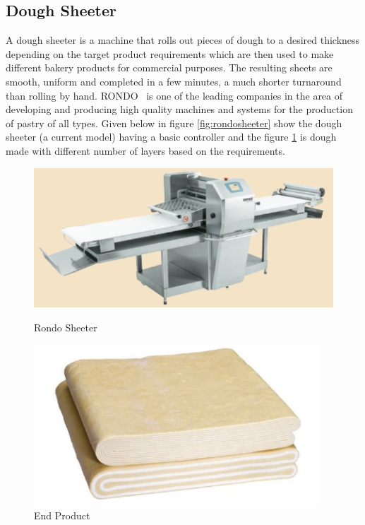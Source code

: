 \documentclass{listhesis}
\begin{document}
\subsection{Dough Sheeter}

A dough sheeter is a machine that rolls out pieces of dough to a desired thickness depending on the target product requirements which are then used to make different bakery products for commercial purposes. The resulting sheets are smooth, uniform and completed in a few minutes, a much shorter turnaround than rolling by hand. RONDO~\cite{rondo} is one of the leading companies in the area of developing and producing high quality machines and systems for the production of pastry of all types.  Given below in figure \ref{fig:rondosheeter}  show  the dough sheeter (a current model) having a basic controller and the figure \ref{fig:endproduct} is dough made with different number of layers based on the requirements.

\begin{figure}[!b]
  \includegraphics[width=0.7\linewidth]{rondosheeter.png}
  \centering
  \caption{Rondo Sheeter}
  \label{fig:rondosheeter}

  \includegraphics[width=0.5\linewidth]{endproduct.png}
  \centering
  \caption{End Product}
  \label{fig:endproduct}
\end{figure}
\end{document}
